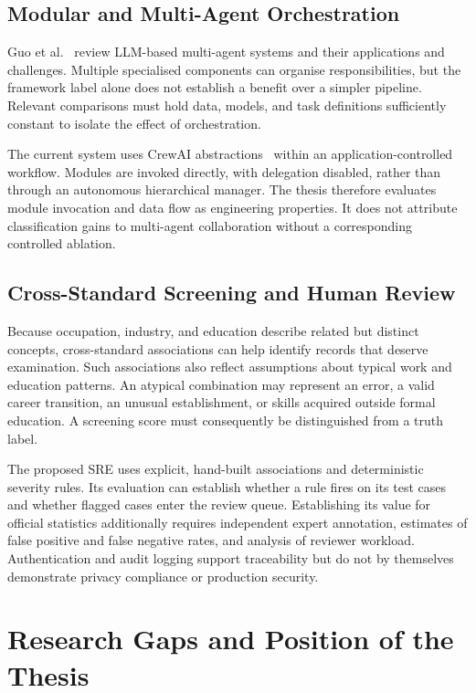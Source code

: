\subsection{Modular and Multi-Agent Orchestration}

Guo et al.~\cite{guo2024multiagent} review LLM-based multi-agent systems
and their applications and challenges. Multiple specialised components
can organise responsibilities, but the framework label alone does not
establish a benefit over a simpler pipeline. Relevant comparisons must
hold data, models, and task definitions sufficiently constant to isolate
the effect of orchestration.

The current system uses CrewAI abstractions~\cite{crewai2024} within an
application-controlled workflow. Modules are invoked directly, with
delegation disabled, rather than through an autonomous hierarchical
manager. The thesis therefore evaluates module invocation and data flow
as engineering properties. It does not attribute classification gains to
multi-agent collaboration without a corresponding controlled ablation.

\subsection{Cross-Standard Screening and Human Review}

Because occupation, industry, and education describe related but distinct
concepts, cross-standard associations can help identify records that
deserve examination. Such associations also reflect assumptions about
typical work and education patterns. An atypical combination may represent
an error, a valid career transition, an unusual establishment, or skills
acquired outside formal education. A screening score must consequently
be distinguished from a truth label.

The proposed SRE uses explicit, hand-built associations and deterministic
severity rules. Its evaluation can establish whether a rule fires on its
test cases and whether flagged cases enter the review queue. Establishing
its value for official statistics additionally requires independent expert
annotation, estimates of false positive and false negative rates, and
analysis of reviewer workload. Authentication and audit logging support
traceability but do not by themselves demonstrate privacy compliance or
production security.

\section{Research Gaps and Position of the Thesis}
\label{sec:rw-gaps}

